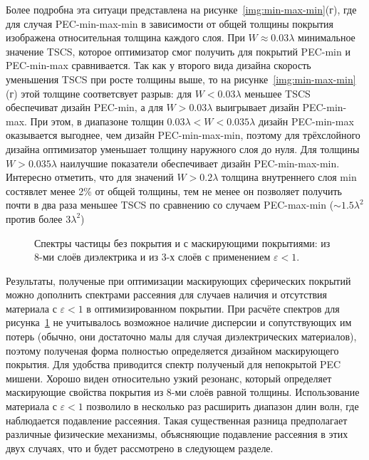 Более подробна эта ситуаци представлена на
рисунке~\ref{img:min-max-min}(г), где для случая PEC-min-max-min в
зависимости от общей толщины покрытия изображена относительная толщина
каждого слоя. При $W\approx0.03\lambda$ минимальное значение TSCS,
которое оптимизатор смог получить для покрытий PEC-min и PEC-min-max
сравнивается. Так как у второго вида дизайна скорость уменьшения TSCS
при росте толщины выше, то на рисунке~\ref{img:min-max-min}(г) этой
толщине соответсвует разрыв: для $W<0.03\lambda$ меньшее TSCS
обеспечиват дизайн PEC-min, а для $W>0.03\lambda$ выигрывает дизайн
PEC-min-max. При этом, в диапазоне толщин
$0.03\lambda < W < 0.035\lambda$ дизайн PEC-min-max оказывается
выгоднее, чем дизайн PEC-min-max-min, поэтому для трёхслойного дизайна
оптимизатор уменьшает толщину наружного слоя до нуля. Для толщины
$W>0.035\lambda$ наилучшие показатели обеспечивает дизайн
PEC-min-max-min. Интересно отметить, что для значений 
$W>0.2\lambda$ толщина внутреннего слоя min состявлет менее 2\% от
общей толщины, тем не менее он позволяет получить почти в два раза
меньшее TSCS по сравнению со случаем PEC-max-min ($\sim
1.5\lambda^2$ против более $3 \lambda^2$)

\begin{figure}[t]
  \centering
  \caption{ Спектры частицы без покрытия и с маскирующими
    покрытиями: из 8-ми слоёв диэлектрика и из 3-х слоёв с применением
    ${\varepsilon<1}$.\label{img:index07-spectra} 
    }
\end{figure}
Результаты, полученые при оптимизации маскирующих сферических покрытий
можно дополнить спектрами рассеяния для случаев наличия и отсутствия
материала с ${\varepsilon<1}$ в оптимизированном покрытии.  При
расчёте спектров для рисунка~\ref{img:index07-spectra} не учитывалось
возможное наличие дисперсии и сопутствующих им потерь (обычно, они
достаточно малы для случая диэлектрических материалов), поэтому
полученая форма полностью определяется дизайном маскирующего
покрытия. Для удобства приводится спектр полученый для непокрытой PEC
мишени.  Хорошо виден относительно узкий резонанс, который определяет
маскирующие свойства покрытия из 8-ми слоёв равной
толщины. Использование материала с ${\varepsilon<1}$ позволило в
несколько раз расширить диапазон длин волн, где наблюдается подавление
рассеяния.  Такая существенная разница предполагает различные
физические механизмы, объясняющие подавление рассеяния в этих двух
случаях, что и будет рассмотрено в следующем разделе.


